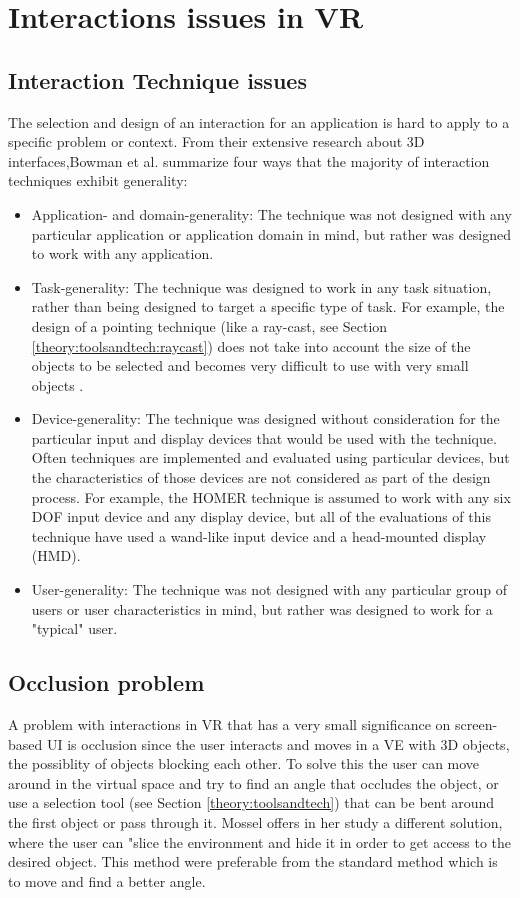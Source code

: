 \section{Interactions issues in VR}
\subsection{Interaction Technique issues}
The selection and design of an interaction for an application is hard to apply to a specific problem or context. From their extensive research about 3D interfaces,Bowman et al. \cite{interactions:Bowman2006} summarize four ways that the majority of interaction techniques exhibit generality:
\begin{itemize}
  \item Application- and domain-generality: The technique was not designed with any particular application or application domain in mind, but rather was designed to work with any application.
  \item Task-generality: The technique was designed to work in any task situation, rather than being designed to target a specific type of task. For example, the design of a pointing technique (like a ray-cast, see Section \ref{theory:toolsandtech:raycast}) does not take into account the size of the objects to be selected and becomes very difficult to use with very small objects \cite{interaction:Poupyrev1997}.
  \item Device-generality: The technique was designed without consideration for the particular input and display devices that would be used with the technique. Often techniques are implemented and evaluated using particular devices, but the characteristics of those devices are not considered as part of the design process. For example, the HOMER technique \cite{interactions:Bowman1997} is assumed to work with any six DOF input device and any display device, but all of the evaluations of this technique have used a wand-like input device and a head-mounted display (HMD).
  \item User-generality: The technique was not designed with any particular group of users or user characteristics in mind, but rather was designed to work for a "typical" user.
\end{itemize}

\subsection{Occlusion problem}
A problem with interactions in VR that has a very small significance on screen-based UI is occlusion since the user interacts and moves in a VE with 3D objects, the possiblity of objects blocking each other\cite{interactions:cutting1997eye}. To solve this the user can move around in the virtual space and try to find an angle that occludes the object, or use a selection tool (see Section \ref{theory:toolsandtech}) that can be bent around the first object or pass through it. Mossel offers in her study a different solution, where the user can "slice the environment and hide it in order to get access to the desired object.\cite{interactions:Mossel2016}
This method were preferable from the standard method which is to move and find a better angle.
